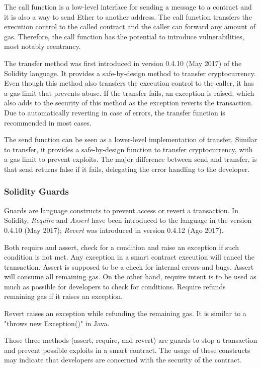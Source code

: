 \documentclass[10pt,conference]{IEEEtran}
\begin{document}
The call function is a low-level interface for sending a message to a contract and it is also a way to send Ether to another address. The call function transfers the execution control to the called contract and the caller can forward any amount of gas. Therefore, the call function has the potential to introduce vulnerabilities, most notably reentrancy.

The transfer method was first introduced in version 0.4.10 (May 2017) of the Solidity language. It provides a safe-by-design method to transfer cryptocurrency. Even though this method also transfers the execution control to the caller, it has a gas limit that prevents abuse. If the transfer fails, an exception is raised, which also adds to the security of this method as the exception reverts the transaction. Due to automatically reverting in case of errors, the transfer function is recommended in most cases.

The send function can be seen as a lower-level implementation of transfer. Similar to transfer, it provides a safe-by-design function to transfer cryptocurrency, with a gas limit to prevent exploits. The major difference between send and transfer, is that send returns false if it fails, delegating the error handling to the developer.


\subsubsection{Solidity Guards}

Guards are language constructs to prevent access or revert a transaction. In Solidity, \textit{Require} and \textit{Assert} have been introduced to the language in the version 0.4.10 (May 2017); \textit{Revert} was introduced in version 0.4.12 (Ago 2017).

Both {require} and {assert}, check for a condition and raise an exception if such condition is not met. Any exception in a smart contract execution will cancel the transaction. Assert is supposed to be a check for internal errors and bugs. Assert will consume all remaining gas. On the other hand, require intent is to be used as much as possible for developers to check for conditions. Require refunds remaining gas if it raises an exception.

Revert raises an exception while refunding the remaining gas. It is similar to a "throws new Exception()" in Java.

Those three methods (assert, require, and revert) are guards to stop a transaction and prevent possible exploits in a smart contract. The usage of these constructs may indicate that developers are concerned with the security of the contract.
\end{document}
